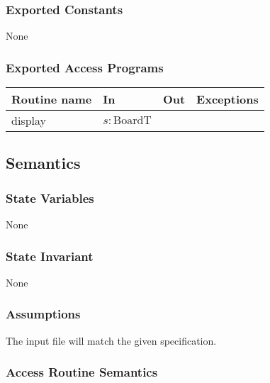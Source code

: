 \documentclass[12pt]{article}
\begin{document}
\subsubsection* {Exported Constants}

None

\subsubsection* {Exported Access Programs}

\begin{tabular}{| l | l | l | l |}
\hline
\textbf{Routine name} & \textbf{In} & \textbf{Out} & \textbf{Exceptions}\\
\hline
display & $s: \mbox{BoardT}$ & ~ & ~\\
\hline

\end{tabular}

\subsection* {Semantics}

\subsubsection* {State Variables}

None

\subsubsection* {State Invariant}

None

\subsubsection* {Assumptions}

The input file will match the given specification.

\subsubsection* {Access Routine Semantics}
\end{document}
